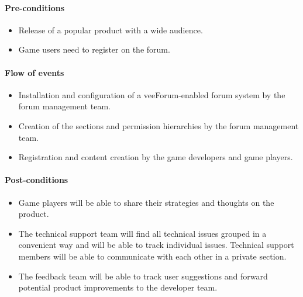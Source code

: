 \documentclass[12pt]{report}
\begin{document}
                        \paragraph{Pre-conditions}
                            \begin{itemize}
                                \item Release of a popular product with a wide audience.                            
                                \item Game users need to register on the forum.
                            \end{itemize}

                        \paragraph{Flow of events}
                            \begin{itemize}
                                \item Installation and configuration of a veeForum-enabled forum system by the forum management team.                            
                                \item Creation of the sections and permission hierarchies by the forum management team.
                                \item Registration and content creation by the game developers and game players.
                            \end{itemize}

                        \paragraph{Post-conditions}
                            \begin{itemize}
                                \item Game players will be able to share their strategies and thoughts on the product.
                                \item The technical support team will find all technical issues grouped in a convenient way and will be able to track individual issues. Technical support members will be able to communicate with each other in a private section.
                                \item The feedback team will be able to track user suggestions and forward potential product improvements to the developer team.
                            \end{itemize}
\end{document}
